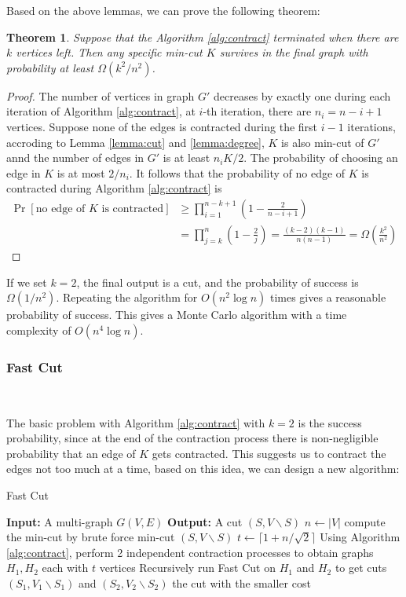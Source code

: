 \documentclass[12pt]{article}
\newtheorem{theorem}{Theorem}
\begin{document}
Based on the above lemmas, we can prove the following theorem:

\begin{theorem}
    \label{theorem:contract}
    Suppose that the Algorithm \ref{alg:contract} terminated when there are $k$ vertices left. Then any specific min-cut $K$ survives in the final graph with probability at least $\Omega(k^2/n^2)$.
\end{theorem}
\begin{proof}
    The number of vertices in graph $G'$ decreases by exactly one during each iteration of Algorithm \ref{alg:contract}, at $i$-th iteration, there are $n_i=n-i+1$ vertices. Suppose none of the edges is contracted during the first $i-1$ iterations, accroding to Lemma \ref{lemma:cut} and \ref{lemma:degree}, $K$ is also min-cut of $G'$ annd the number of edges in $G'$ is at least $n_iK/2$. The probability of choosing an edge in $K$ is at most $2/n_i$. It follows that the probability of no edge of $K$ is contracted during Algorithm \ref{alg:contract} is
\begin{align*}
    \Pr[\text{no edge of }K\text{ is contracted}]&\ge\prod_{i=1}^{n-k+1}\left(1-\frac{2}{n-i+1}\right)\\
    &=\prod_{j=k}^n\left(1-\frac{2}{j}\right)=\frac{(k-2)(k-1)}{n(n-1)}=\Omega\left(\frac{k^2}{n^2}\right)
\end{align*}
\end{proof}


If we set $k=2$, the final output is a cut, and the probability of success is $\Omega(1/n^2)$. Repeating the algorithm for $O(n^2\log n)$ times gives a reasonable probability of success. This gives a Monte Carlo algorithm with a time complexity of $O(n^4\log n)$.

\subsubsection{Fast Cut}\

The basic problem with Algorithm \ref{alg:contract} with $k=2$ is the success probability, since at the end of the contraction process there is non-negligible probability that an edge of $K$ gets contracted. This suggests us to contract the edges not too much at a time, based on this idea, we can design a new algorithm:

\begin{algorithm}
\caption{Fast Cut}
\label{alg:fastcut}
\begin{algorithmic}
    \STATE \textbf{Input:} A multi-graph $G(V,E)$
    \STATE \textbf{Output:} A cut $(S,V\backslash S)$
    \STATE $n\leftarrow |V|$
    \STATE compute the min-cut by brute force
    \RETURN min-cut $(S,V\backslash S)$
    \ELSE
    \STATE $t\leftarrow \lceil 1+n/\sqrt{2}\rceil$
    \STATE Using Algorithm \ref{alg:contract}, perform 2 independent contraction processes to obtain graphs $H_1,H_2$ each with $t$ vertices
    \STATE Recursively run Fast Cut on $H_1$ and $H_2$ to get cuts $(S_1,V_1\backslash S_1)$ and $(S_2,V_2\backslash S_2)$
    \RETURN the cut with the smaller cost
    \ENDIF
\end{algorithmic}
\end{algorithm}
\end{document}
